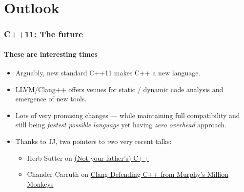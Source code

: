 \documentclass[dvipsnames,compress,pdflatex,beamer]{beamer}
\begin{document}
\section{Outlook}
\begin{frame}
  \frametitle{C++11: The future}
  \framesubtitle{These are interesting times}

  \begin{itemize}[<+->]
  \item Arguably, new standard C++11 makes C++ a new language.
  \item LLVM/Clang++ offers venues for static / dynamic code
    analysis and emergence of new tools.
  \item Lots of very promising changes --- while maintaining full
    compatibility and still being \emph{fastest possible language} yet having
    \emph{zero overhead} approach.
  \item Thanks to JJ, two pointers to two very recent talks: 
    \begin{itemize}
    \item Herb Sutter on \href{http://channel9.msdn.com/Events/Lang-NEXT/Lang-NEXT-2012/-Not-Your-Father-s-C-}{(Not your father's) C++}
    \item Chander Carruth on \href{http://channel9.msdn.com/Events/GoingNative/GoingNative-2012/Clang-Defending-C-from-Murphy-s-Million-Monkeys}{Clang Defending C++ from Murphy's Million Monkeys}
    \end{itemize}
  \end{itemize}
\end{frame}





 
\end{document}
